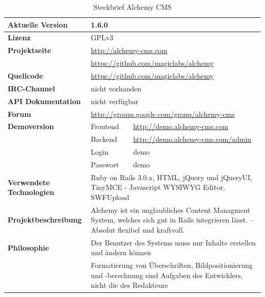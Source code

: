\begin{table}[bp]
\caption{Steckbrief Alchemy CMS}
\begin{tabular}[!ht]{|l|l|l|}
\hline
\textbf{Aktuelle Version} & \multicolumn{2}{p{10cm}|}{1.6.0} \\
\hline
\textbf{Lizenz} & \multicolumn{2}{p{10cm}|}{GPLv3} \\
\hline
\textbf{Projektseite} & \multicolumn{2}{p{10cm}|}{\href{http://alchemy-cms.com}{http://alchemy-cms.com}} \\
 & \multicolumn{2}{p{10cm}|}{\href{https://github.com/magiclabs/alchemy}{https://github.com/magiclabs/alchemy}} \\
\hline
\textbf{Quellcode} & \multicolumn{2}{p{10cm}|}{\href{https://github.com/magiclabs/alchemy}{https://github.com/magiclabs/alchemy}} \\
\hline
\textbf{IRC-Channel} & \multicolumn{2}{p{10cm}|}{nicht vorhanden} \\
\hline
\textbf{API Dokumentation} & \multicolumn{2}{p{10cm}|}{nicht verfügbar} \\
\hline
\textbf{Forum} & \multicolumn{2}{p{10cm}|}{\href{http://groups.google.com/group/alchemy-cms}{http://groups.google.com/group/alchemy-cms}} \\
\hline
\textbf{Demoversion} & Frontend & \href{http://demo.alchemy-cms.com}{http://demo.alchemy-cms.com} \\
\cline{2-3}
& Backend & \href{http://demo.alchemy-cms.com/admin}{http://demo.alchemy-cms.com/admin} \\
\cline{2-3}
& Login & demo \\
\cline{2-3}
& Passwort & demo \\
\hline
\textbf{Verwendete Technologien} & \multicolumn{2}{p{10cm}|}{Ruby on Rails 3.0.x, HTML, jQuery und jQueryUI, TinyMCE - Javascript WYSIWYG Editor, SWFUpload} \\
\hline
\textbf{Projektbeschreibung} & \multicolumn{2}{p{10cm}|}{Alchemy ist ein unglaubliches Content Managment System, welches sich gut in Rails integrieren lässt. – Absolut flexibel und kraftvoll.} \\
\hline
\textbf{Philosophie} & \multicolumn{2}{p{10cm}|}{Der Benutzer des Systems muss nur Inhalte erstellen und ändern können} \\
& \multicolumn{2}{p{10cm}|}{Formatierung von Überschriften, Bildpositionierung und -berechnung sind Aufgaben des Entwicklers, nicht die des Redakteurs}\\
\hline
\end{tabular}
\end{table}
